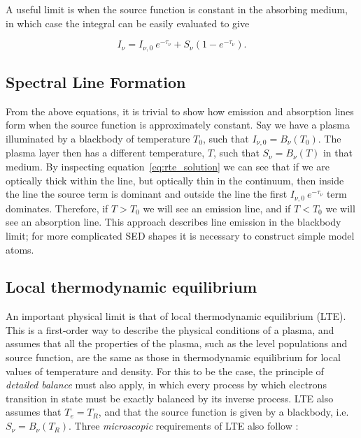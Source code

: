 A useful limit is when the source function is constant in the absorbing medium, in which case
the integral can be easily evaluated to give

\begin{equation}
I_\nu = I_{\nu,0}~e^{-\tau_\nu} + S_\nu (1 - e^{-\tau_\nu}).
\label{eq:rte_solution}
\end{equation}




\subsection{Spectral Line Formation}

From the above equations, it is trivial to show how emission and absorption lines form when
the source function is approximately constant.
Say we have a plasma illuminated by a blackbody of temperature $T_0$, such that
$I_{\nu,0} = B_\nu (T_0)$. The plasma layer then has a different temperature, $T$,
such that $S_\nu = B_\nu (T)$ in that medium. By inspecting equation~\ref{eq:rte_solution}
we can see that if we are optically thick within the line, but optically
thin in the continuum, then inside the line the source term is dominant and outside 
the line the first $I_{\nu,0}~e^{-\tau_\nu}$ term dominates. Therefore, if $T > T_0$ we will 
see an emission line, and if $T < T_0$ we will see an absorption line. 
This approach describes line emission in the blackbody limit; for more complicated SED shapes
it is necessary to construct simple model atoms.

\subsection{Local thermodynamic equilibrium}
\label{sec:lte}


An important physical limit is that of local thermodynamic equilibrium (LTE).
This is a first-order way to describe the physical conditions of a plasma, and assumes
that all the properties of the plasma, such as the level populations and source function,
are the same as those in thermodynamic equilibrium for local values of 
temperature and density. For this to be the case, the principle of 
{\em detailed balance} must also apply, in which every 
process by which electrons transition in state must be exactly 
balanced by its inverse process. LTE also assumes that $T_e = T_R$, and that
the source function is given by a blackbody, i.e. $S_\nu = B_\nu (T_R)$.
Three {\em microscopic} 
requirements of LTE also follow \citep{mihalas}:

